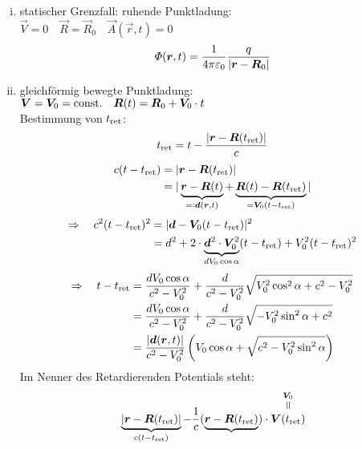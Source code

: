 \begin{enumerate}[i)]
	\item statischer Grenzfall: ruhende Punktladung:\\
	$ \vec{V} = 0 \quad \vec{R} = \vec{R}_0 \quad \vec{A}(\vec{r},t) = 0 $
	\begin{equation*}
	\varPhi(\bm{r},t) = \frac{1}{4\pi\varepsilon_0} \frac{q}{|\bm{r} - \bm{R}_0|}
	\end{equation*}
	\item gleichförmig bewegte Punktladung:\\
	$ \bm{V} = \bm{V}_0 = \textrm{const.} \quad \bm{R}(t) = \bm{R}_0 + \bm{V}_0 \cdot t $\\[5pt]
	Bestimmung von $ t_{\textrm{ret}} $:
	\begin{equation*}
	t_{\textrm{ret}} = t - \frac{|\bm{r} - \bm{R}(t_{\textrm{ret}})|}{c}
	\end{equation*}
	\begin{align*}
	c(t - t_{\tx{ret}}) &= |\vec{r} - \vec{R}(t_{\tx{ret}})|\\
	&= |\ub{\vec{r} - \vec{R}(t)}_{\eqdef \vec{d}(\vec{r},t)} + \ub{\vec{R}(t) - \vec{R}(t_{\tx{ret}})}_{= \vec{V}_0 (t - t_{\tx{ret}})}|
	\end{align*}
	\begin{align*}
	\Rightarrow \quad c^2(t - t_{\textrm{ret}})^2 &= | \bm{d} - \bm{V}_0(t - t_{\textrm{ret}})|^2\\
	&= d^2 + 2 \cdot \underbrace{\bm{d}^2 \cdot \bm{V}_0^2}_{d V_0 \cos \alpha} (t - t_{\textrm{ret}}) + V_0^2 (t-t_{\textrm{ret}})^2
	\end{align*}
	\begin{align*}
	\Rightarrow \quad t - t_{\textrm{ret}} &= \frac{d V_0 \cos \alpha}{c^2 - V_0^2} + \frac{d}{c^2 - V_0^2} \sqrt{V_0^2 \cos^2 \alpha + c^2 - V_0^2} \\
	&= \frac{d V_0 \cos \alpha}{c^2 - V_0^2} + \frac{d}{c^2 - V_0^2} \sqrt{- V_0^2 \sin^2 \alpha + c^2}\\
	&= \frac{|\bm{d}(\bm{r},t)|}{c^2 - V_0^2} \left(V_0 \cos \alpha + \sqrt{c^2 - V_0^2 \sin^2 \alpha}\right)
	\end{align*}
	Im Nenner des Retardierenden Potentials steht:
	\begin{align*}
	& \ub{|\vec{r} - \vec{R}(t_{\tx{ret}})|}_{c ( t - t_{\tx{ret}})} - \frac{1}{c} (\ub{\vec{r} - \vec{R}(t_{\tx{ret}})}) \cdot \equaltoup{\vec{V}(t_{\tx{ret}})}{\vec{V}_0}\\

\end{align*}
\end{enumerate}
